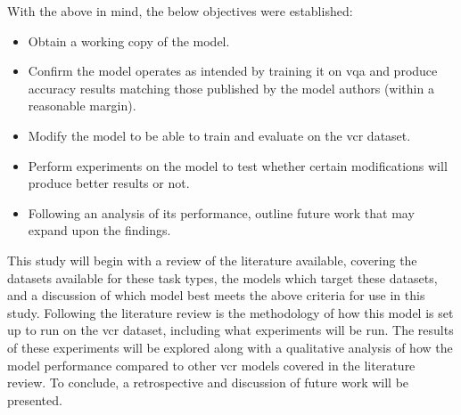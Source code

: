 With the above in mind, the below objectives were established:

\begin{itemize}\label{list:list_of_objectives}
    \item Obtain a working copy of the model.
    \item Confirm the model operates as intended by training it on \gls{vqa} and produce accuracy results matching those published by the model authors (within a reasonable margin).
    \item Modify the model to be able to train and evaluate on the \gls{vcr} dataset.
    \item Perform experiments on the model to test whether certain modifications will produce better results or not.
    \item Following an analysis of its performance, outline future work that may expand upon the findings.
\end{itemize}

This study will begin with a review of the literature available, covering the datasets available for these task types, the models which target these datasets, and a discussion of which model best meets the above criteria for use in this study.
Following the literature review is the methodology of how this model is set up to run on the \gls{vcr} dataset, including what experiments will be run.
The results of these experiments will be explored along with a qualitative analysis of how the model performance compared to other \gls{vcr} models covered in the literature review.
To conclude, a retrospective and discussion of future work will be presented.
